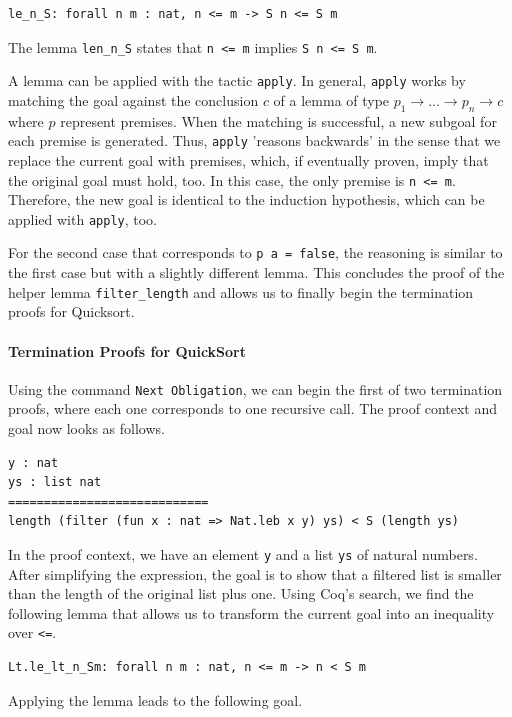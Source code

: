 \documentclass[a4paper, 11pt, fleqn, twoside, abstract=on]{scrreprt}
\newcommand{\cinl}[1]{\texttt{#1}}
\begin{document}
\begin{verbatim}
le_n_S: forall n m : nat, n <= m -> S n <= S m
\end{verbatim}
\noindent
The lemma \cinl{len_n_S} states that \cinl{n <= m} implies \cinl{S n <= S m}.

A lemma can be applied with the tactic \cinl{apply}.
In general, \cinl{apply} works by matching the goal against the conclusion $c$ of a lemma of type $p_1 \rightarrow \dots \rightarrow p_n \rightarrow c$ where $p$ represent premises.
When the matching is successful, a new subgoal for each premise is generated.
Thus, \cinl{apply} 'reasons backwards' in the sense that we replace the current goal with premises, which, if eventually proven, imply that the original goal must hold, too. 
In this case, the only premise is \cinl{n <= m}.
Therefore, the new goal is identical to the induction hypothesis, which can be applied with \cinl{apply}, too.

For the second case that corresponds to \cinl{p a = false}, the reasoning is similar to the first case but with a slightly different lemma.
This concludes the proof of the helper lemma \cinl{filter_length} and allows us to finally begin the termination proofs for Quicksort.

\paragraph{Termination Proofs for QuickSort}
Using the command \cinl{Next Obligation}, we can begin the first of two termination proofs, where each one corresponds to one recursive call.
The proof context and goal now looks as follows.

\begin{verbatim}
y : nat
ys : list nat
============================
length (filter (fun x : nat => Nat.leb x y) ys) < S (length ys)
\end{verbatim}

In the proof context, we have an element \cinl{y} and a list \cinl{ys} of natural numbers.
After simplifying the expression, the goal is to show that a filtered list is smaller than the length of the original list plus one.
Using Coq's search, we find the following lemma that allows us to transform the current goal into an inequality over \cinl{<=}.

\begin{verbatim}
Lt.le_lt_n_Sm: forall n m : nat, n <= m -> n < S m
\end{verbatim}
\noindent
Applying the lemma leads to the following goal.
\end{document}
